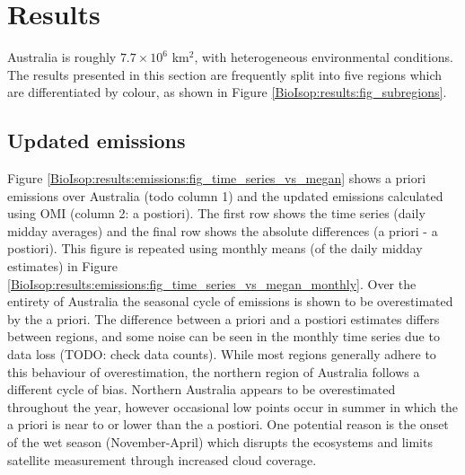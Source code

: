 
\section{Results}
  \label{BioIsop:results}
  
  Australia is roughly $7.7 \times 10^6$ km$^{2}$, with heterogeneous environmental conditions.
  The results presented in this section are frequently split into five regions which are differentiated by colour, as shown in Figure \ref{BioIsop:results:fig_subregions}.
  
  
  
  \subsection{Updated emissions}
    \label{BioIsop:results:emissions}
    
    Figure \ref{BioIsop:results:emissions:fig_time_series_vs_megan} shows a priori emissions over Australia (todo column 1) and the updated emissions calculated using OMI (column 2: a postiori).
    The first row shows the time series (daily midday averages) and the final row shows the absolute differences (a priori - a postiori).
    This figure is repeated using monthly means (of the daily midday estimates) in Figure \ref{BioIsop:results:emissions:fig_time_series_vs_megan_monthly}.
    Over the entirety of Australia the seasonal cycle of emissions is shown to be overestimated by the a priori.
    The difference between a priori and a postiori estimates differs between regions, and some noise can be seen in the monthly time series due to data loss (TODO: check data counts).
    While most regions generally adhere to this behaviour of overestimation, the northern region of Australia follows a different cycle of bias.
    Northern Australia appears to be overestimated throughout the year, however occasional low points occur in summer in which the a priori is near to or lower than the a postiori.
    One potential reason is the onset of the wet season (November-April) which disrupts the ecosystems and limits satellite measurement through increased cloud coverage.
    
